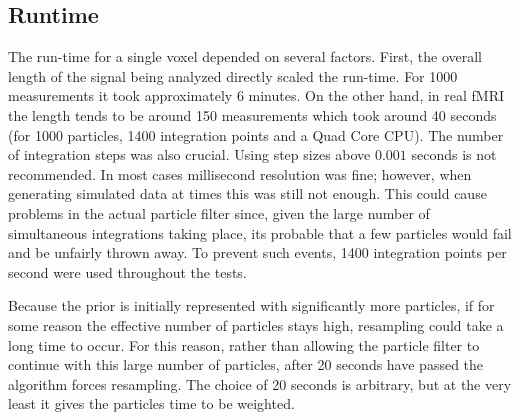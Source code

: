 \subsection{Runtime}
The run-time for a single voxel depended on several factors. First, the
overall length of the signal being analyzed directly scaled the run-time. 
For 1000 measurements it took
approximately 6 minutes. On the other hand, in real \ac{fMRI} the
length tends to be around 150 measurements which took around 40 seconds 
(for 1000 particles, 1400 integration points and a Quad Core CPU). The number of
integration steps was also crucial. Using step sizes above
$0.001$ seconds is not recommended. In most cases millisecond resolution
was fine; however, when generating simulated data at times this was
still not enough. This could cause problems in the actual particle
filter since, given the large number of simultaneous integrations taking
place, its probable that a few particles would fail and be unfairly thrown away.
To prevent such events, 1400 integration points per second were used throughout
the tests.

Because the prior is initially represented with significantly more
particles, if for some reason the effective
number of particles stays high, resampling could take a long time to occur.
For this reason, rather than allowing the particle filter to continue 
with this large number of particles, after 20 seconds have passed the
algorithm forces resampling. The choice of 20 seconds is
arbitrary, but at the very least it gives the particles time to be weighted.

